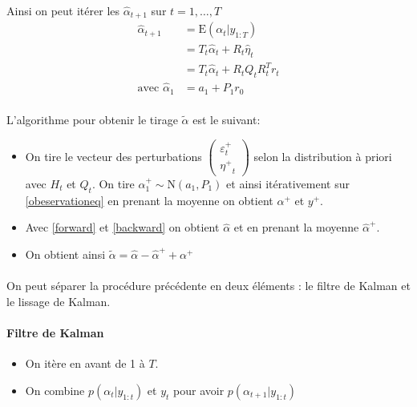 \documentclass{article}
\theoremstyle{definition}
\theoremstyle{remark}
\begin{document}
        Ainsi on peut itérer les $\hat{\alpha}_{t+1}$ sur $t=1, \ldots, T$
\begin{equation}
    \label{forward}
    \begin{aligned}
		\hat{\alpha}_{t+1}&=\mathrm{E}\left(\alpha_{t} | y_{1: T}\right) \\
		 &= T_{t} \hat{\alpha}_{t}+R_{t}\hat{\eta}_t \\
        &= T_{t} \hat{\alpha}_{t}+R_{t} Q_{t} R_{t}^{T} r_{t}\\
        \text{avec }\hat{\alpha}_{1} &= a_{1}+P_{1} r_{0}
    \end{aligned}
\end{equation}

\paragraph{}
L'algorithme pour obtenir le tirage $\tilde{\alpha}$ est le suivant:
\begin{itemize}[label={$\bullet$}]
\item On tire le vecteur des perturbations  $\left(\begin{array}{c}{
    \varepsilon_t^+} \\ 
    {\eta^+}_t\end{array}
    \right)$   
selon la distribution à priori avec $H_t$ et $Q_t$. On tire $\alpha_{1}^{+} \sim \mathrm{N}\left(a_{1}, P_{1}\right)$ et ainsi 
itérativement sur \ref{obeservationeq} en prenant la moyenne on obtient $\alpha^+$ et $y^+$.
\item Avec \ref{forward} et \ref{backward} on obtient $\hat{\alpha}$ et en prenant la moyenne $\hat{\alpha}^+$.
\item On obtient ainsi $\tilde{\alpha}=\hat{\alpha}-\hat{\alpha}^{+}+\alpha^{+}$
\end{itemize}

\paragraph{}
On peut séparer la procédure précédente en deux éléments : le filtre de Kalman et le lissage de Kalman.

\paragraph{Filtre de Kalman}
\begin{itemize}
\item On itère en avant de 1 à $T$.
\item On combine $p\left(\alpha_{t} | y_{1: t}\right)$ et $y_t$ pour avoir $p\left(\alpha_{t+1} | y_{1: t}\right)$
\end{itemize}
\end{document}
